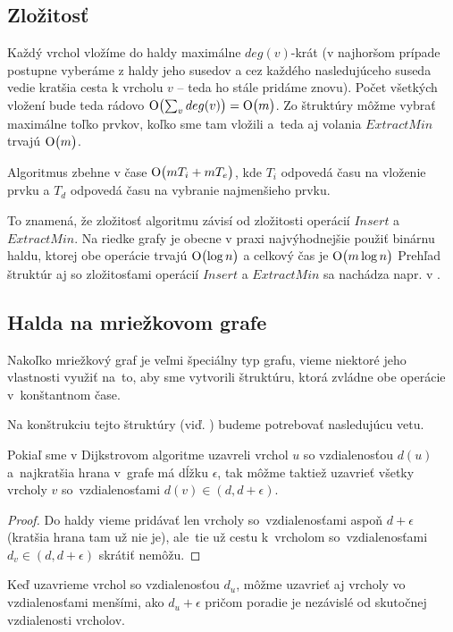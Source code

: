 \subsection{Zložitosť}
Každý vrchol vložíme do haldy maximálne $deg(v)$-krát 
(v najhoršom prípade postupne vyberáme z haldy jeho susedov a cez každého nasledujúceho suseda vedie kratšia cesta k vrcholu $v$ -- teda ho stále pridáme znovu).
Počet všetkých vložení bude teda rádovo $\operatorname{O}\bigl(\sum_{v}{deg(v)}\bigr) = \operatorname{O}\bigl(m\bigr)$.
Zo štruktúry môžme vybrať maximálne toľko prvkov, koľko sme tam vložili a~teda aj volania $ExtractMin$ trvajú $\operatorname{O}\bigl(m\bigr)$.

Algoritmus zbehne v čase $\operatorname{O}\bigl(m T_i + m T_e\bigr)$, kde $T_i$ odpovedá času na vloženie prvku a $T_d$ odpovedá času na vybranie najmenšieho prvku.

To znamená, že zložitosť algoritmu závisí od zložitosti operácií $Insert$ a $ExtractMin$. Na riedke grafy je obecne v praxi najvýhodnejšie použiť 
binárnu haldu, ktorej obe operácie trvajú $\operatorname{O}\bigl(\log{n} \bigr) $ a celkový čas je 
 $\operatorname{O}\bigl(m\log{n}\bigr)$
Prehľad štruktúr aj so zložitosťami operácií $Insert$ a $ExtractMin$ sa nachádza napr. v \cite{mares07}.

\subsection{Halda na mriežkovom grafe}
Nakoľko mriežkový graf je veľmi špeciálny typ grafu,
vieme niektoré jeho vlastnosti využiť na~to, aby sme vytvorili štruktúru, ktorá zvládne obe operácie v~konštantnom čase. 


Na konštrukciu tejto štruktúry (viď. \cite{gs97}) budeme potrebovať nasledujúcu vetu.

\begin{theorem}
\label{dinic-observation}
Pokiaľ sme v Dijkstrovom algoritme uzavreli vrchol $u$ so vzdialenosťou $d(u)$ a~najkratšia hrana v~grafe má dĺžku $\epsilon$, tak môžme taktiež 
uzavrieť všetky vrcholy $v$ so~vzdialenosťami $d(v) \in (d, d + \epsilon)$.
\end{theorem}
\begin{proof}
Do haldy vieme pridávať len vrcholy so~vzdialenosťami aspoň $d + \epsilon$ (kratšia hrana tam už nie je), 
ale~tie už cestu k~vrcholom so~vzdialenosťami
$d_v \in (d, d + \epsilon)$ skrátiť nemôžu.
\end{proof}


\begin{consequence}
Keď uzavrieme vrchol so vzdialenosťou $d_u$, môžme uzavrieť aj vrcholy vo vzdialenosťami menšími, ako $d_u + \epsilon$
pričom poradie je nezávislé od skutočnej vzdialenosti vrcholov.
\end{consequence}

